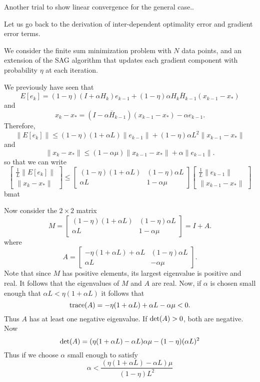 \documentclass{article}
\begin{document}
 
\noindent

Another trial to show linear convergence for the general case..

\bigskip

Let us go back to the derivation of inter-dependent optimality error and gradient error terms.

We consider the finite sum minimization problem with $N$ data points, and an extension of the SAG algorithm that updates each gradient component with probability $\eta$ at each iteration.

We previously have seen that
\[
  E[e_k]=(1-\eta)(I+\alpha H_k)e_{k-1} + (1-\eta)\alpha H_k\bar H_{k-1}(x_{k-1}-x_\ast)
\]
and
\[
x_k-x_\ast=(I-\alpha\bar H_{k-1})(x_{k-1}-x_\ast) -\alpha e_{k-1}.
\]
Therefore,
\[
  \|E[e_k]\|\leq(1-\eta)(1+\alpha L)\|e_{k-1}\| + (1-\eta)\alpha L^2\|x_{k-1}-x_\ast\|
\]
and
\[
\|x_k-x_\ast\|\leq(1-\alpha\mu)\|x_{k-1}-x_\ast\| +\alpha \|e_{k-1}\|.
\]
so that we can write
\[
 \begin{bmatrix} \displaystyle\frac{1}{L}\|E[e_k]\| \\
  \|x_k-x_\ast\|
 \end{bmatrix} \leq
 \begin{bmatrix} (1-\eta)(1+\alpha L) & (1-\eta)\alpha L\\  
                   \alpha L  & 1-\alpha\mu \end{bmatrix}                  
 \begin{bmatrix} \displaystyle\frac{1}{L}\|e_{k-1}\| \\
  \|x_{k-1}-x_\ast\|
 \end{bmatrix}                  
\]bmat

\bigskip
Now consider the $2\times 2$ matrix
\[
M = \begin{bmatrix} (1-\eta)(1+\alpha L) & (1-\eta)\alpha L   \\
                   \alpha L  & 1-\alpha\mu \end{bmatrix}  =I+A.    
\]
where
\[
A= \begin{bmatrix} -\eta(1+\alpha L) + \alpha L& (1-\eta)\alpha L\\     
                   \alpha L  & -\alpha\mu \end{bmatrix}.    
\]                   
Note that since $M$ has positive elements, its largest eigenvalue is  positive and real. It follows that the eigenvalues of $M$ and $A$
are real.  
Now, if $\alpha$ is chosen small enough  that $\alpha L     <\eta (1 + \alpha L) $            
it follows that
\[ 
{\rm trace}(A)= -\eta(1+\alpha L)  +\alpha L - \alpha \mu <0.
\]
Thus $A$ has at least one negative eigenvalue. If ${\rm det}(A) >0$, both are negative.  Now
\[
{\rm det}(A)  = (\eta(1+\alpha L)  -\alpha L)\alpha \mu -(1-\eta)(\alpha L)^2
\]
Thus if we choose $\alpha$ small enough to satisfy
\[
	\alpha < \frac{ (\eta(1+\alpha L)  -\alpha L) \mu}{ (1-\eta) L^2}
\]
\end{document}
